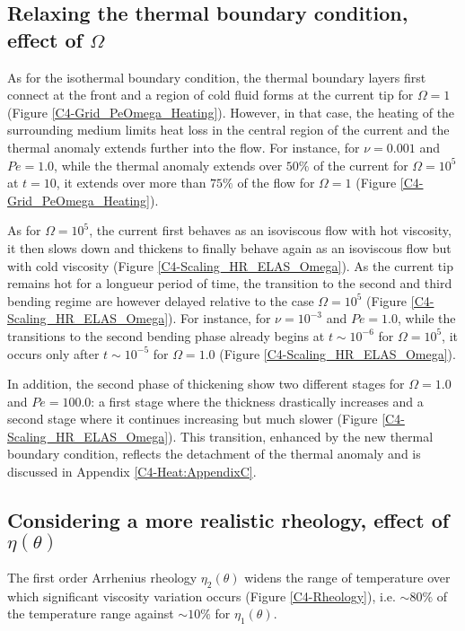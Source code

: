 \subsection{Relaxing  the   thermal  boundary  condition,   effect  of
  $\Omega$}
\label{C4-sec:infl-therm-bound}

As for the isothermal boundary  condition, the thermal boundary layers
first connect  at the front  and a region of  cold fluid forms  at the
current tip  for $\Omega = 1$  (Figure \ref{C4-Grid_PeOmega_Heating}).
However, in  that case, the  heating of the surrounding  medium limits
heat loss in the central region of the current and the thermal anomaly
extends  further into  the flow.   For instance,  for $\nu=0.001$  and
$Pe=1.0$, while the thermal anomaly extends over $50\%$ of the current
for $\Omega = 10^5$ at $t=10$, it extends over more than $75\%$ of the
flow for $\Omega=1$ (Figure \ref{C4-Grid_PeOmega_Heating}).

As for $\Omega=10^5$, the current  first behaves as an isoviscous flow
with hot viscosity, it then slows  down and thickens to finally behave
again  as  an   isoviscous  flow  but  with   cold  viscosity  (Figure
\ref{C4-Scaling_HR_ELAS_Omega}).  As the current tip remains hot for a
longueur  period of  time,  the  transition to  the  second and  third
bending regime are however delayed relative to the case $\Omega= 10^5$
(Figure    \ref{C4-Scaling_HR_ELAS_Omega}).     For   instance,    for
$\nu=10^{-3}$  and  $Pe=1.0$,  while  the transitions  to  the  second
bending phase  already begins at $t\sim  10^{-6}$ for $\Omega=10^{5}$,
it  occurs  only  after  $t\sim 10^{-5}$  for  $\Omega=  1.0$  (Figure
\ref{C4-Scaling_HR_ELAS_Omega}).

In addition, the second phase  of thickening show two different stages
for $\Omega =  1.0$ and $Pe=100.0$: a first stage  where the thickness
drastically increases and a second stage where it continues increasing
but   much  slower   (Figure  \ref{C4-Scaling_HR_ELAS_Omega}).    This
transition, enhanced  by the new thermal  boundary condition, reflects
the detachment  of the  thermal anomaly and  is discussed  in Appendix
\ref{C4-Heat:AppendixC}.

\subsection{Considering   a  more   realistic   rheology,  effect   of
  $\eta(\theta)$}
\label{C4-sec:infl-therm-bound}


The first  order Arrhenius rheology $\eta_2(\theta)$  widens the range
of  temperature  over  which significant  viscosity  variation  occurs
(Figure \ref{C4-Rheology}), i.e.  $\sim80\%$  of the temperature range
against $\sim10\%$ for $\eta_1(\theta)$.

